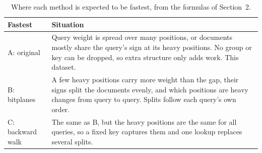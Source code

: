 \begin{table}[htb]\centering\small
\caption{Where each method is expected to be fastest, from the formulas of Section~2.}
\label{tab:regions}
\begin{tabularx}{\linewidth}{@{}lY@{}}\toprule
Fastest & Situation\\\midrule
A: original & Query weight is spread over many positions, or documents mostly share the query's sign at its heavy positions. No group or key can be dropped, so extra structure only adds work. This dataset.\\
B: bitplanes & A few heavy positions carry more weight than the gap, their signs split the documents evenly, and which positions are heavy changes from query to query. Splits follow each query's own order.\\
C: backward walk & The same as B, but the heavy positions are the same for all queries, so a fixed key captures them and one lookup replaces several splits.\\\bottomrule
\end{tabularx}
\end{table}
